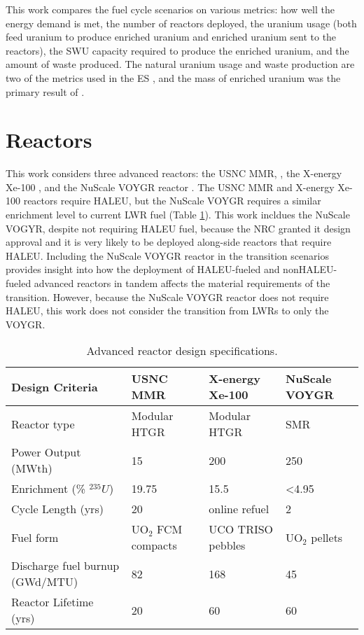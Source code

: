 This work compares the fuel cycle scenarios on various metrics: 
how well the energy demand is met,
the number of reactors deployed, the 
uranium usage (both feed uranium to produce enriched uranium and enriched 
uranium sent to the reactors), 
the \gls{SWU} capacity required to produce the enriched uranium, and the 
amount of waste produced. The natural 
uranium usage and waste production are two of the metrics used in the \gls{ES} 
\cite{wigeland_nuclear_2014}, and the mass of enriched uranium was the 
primary result of \cite{dixon_estimated_2022}.

\section{Reactors} \label{sec:reactor_methods}
This work considers three advanced reactors: the \gls{USNC} \gls{MMR}, 
\cite{noauthor_usnc_2021}, the X-energy Xe-100 
\cite{mulder_overview_2021}, and 
the NuScale VOYGR reactor
\cite{nuscale_chapter_2020-1,reyes_nuscale_2021,reyes_correction_2022}. The 
\gls{USNC} \gls{MMR}
and X-energy Xe-100 reactors require \gls{HALEU}, but the NuScale VOYGR requires
a similar enrichment level to current \gls{LWR} fuel (Table \ref{tab:reactor_summary}). 
This work incldues the NuScale VOGYR, despite not requiring \gls{HALEU} fuel, 
because the \gls{NRC} granted it design approval \cite{world_nuclear_news_nuscale_2021} 
and it is very likely to be 
deployed along-side reactors that require \gls{HALEU}. Including the NuScale 
VOYGR reactor in the transition scenarios provides insight into how the deployment 
of \gls{HALEU}-fueled and non\gls{HALEU}-fueled advanced reactors in tandem 
affects the material requirements of the transition. However, because the 
NuScale VOYGR reactor does not require 
\gls{HALEU}, this work does not consider the transition from \glspl{LWR} 
to only the VOYGR.

\begin{table}[ht]
    \centering
    \caption{Advanced reactor design specifications.}
    \label{tab:reactor_summary}
    \renewcommand{\arraystretch}{1.5}
    \begin{tabular}{p{3.5cm}p{3cm}p{3cm}p{3cm}}
        \hline
        Design Criteria & \gls{USNC} \gls{MMR} \cite{noauthor_usnc_2021} & 
        X-energy Xe-100 \cite{mulder_overview_2021} & NuScale VOYGR 
        \cite{nuscale_chapter_2020-1,reyes_nuscale_2021,reyes_correction_2022}\\
        \hline
        Reactor type & Modular HTGR & Modular HTGR & SMR\\
        Power Output (MWth) & 15 & 200  & 250 \\
        Enrichment (\% $^{235}U$) & 19.75 & 15.5 & <4.95 \\
        Cycle Length (yrs) & 20 & online refuel & 2\\
        Fuel form & UO$_2$ \gls{FCM} compacts & UCO \gls{TRISO} pebbles & UO$_2$ pellets\\
        Discharge fuel burnup (GWd/MTU) & 82 & 
        168  & 45 \\
        Reactor Lifetime (yrs)& 20 & 60 & 60 \\
        \hline
    \end{tabular}
\end{table}

